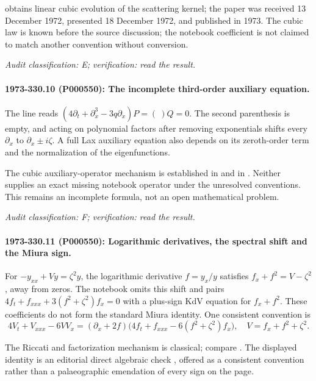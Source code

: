 \citet[equations (13), (18)]{shabat1973kdv} obtains linear cubic evolution of the scattering kernel; the paper was received 13 December 1972, presented 18 December 1972, and published in 1973. The cubic law is known before the source discussion; the notebook coefficient is not claimed to match another convention without conversion.

\emph{Audit classification: E; verification: read the result.}

\paragraph{1973-330.10 (P000550): The incomplete third-order auxiliary equation.}
The line reads \((4\partial_t+\partial_x^3-3q\partial_x)P=(\ )Q=0\). The second parenthesis is empty, and acting on polynomial factors after removing exponentials shifts every \(\partial_x\) to \(\partial_x\pm i\zeta\). A full Lax auxiliary equation also depends on its zeroth-order term and the normalization of the eigenfunctions.

The cubic auxiliary-operator mechanism is established in \citet{shabat1973kdv} and in \citet[\S2, equation (33)]{shabat2014interpolation}. Neither supplies an exact missing notebook operator under the unresolved conventions. This remains an incomplete formula, not an open mathematical problem.

\emph{Audit classification: F; verification: read the result.}

\paragraph{1973-330.11 (P000550): Logarithmic derivatives, the spectral shift and the Miura sign.}
For \(-y_{xx}+Vy=\zeta^2y\), the logarithmic derivative \(f=y_x/y\) satisfies \(f_x+f^2=V-\zeta^2\), away from zeros. The notebook omits this shift and pairs \(4f_t+f_{xxx}+3(f^2+\zeta^2)f_x=0\) with a plus-sign KdV equation for \(f_x+f^2\). These coefficients do not form the standard Miura identity. One consistent convention is \[4V_t+V_{xxx}-6VV_x=(\partial_x+2f)\bigl(4f_t+f_{xxx}-6(f^2+\zeta^2)f_x\bigr),\quad V=f_x+f^2+\zeta^2.\]

The Riccati and factorization mechanism is classical; compare \citet[equations (2), (18)]{shabat2014interpolation}. The displayed identity is an editorial direct algebraic check \oursComputed, offered as a consistent convention rather than a palaeographic emendation of every sign on the page.

